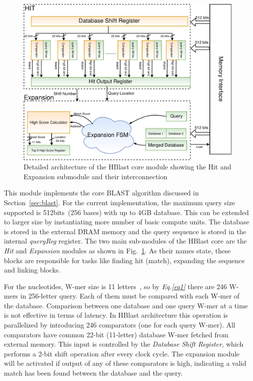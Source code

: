 \begin{figure}[t!]
\centering
\includegraphics[width=\columnwidth]{Figures/BlastMachine.pdf}
\caption{Detailed architecture of the HBlast core module showing the Hit and Expansion submodule and their interconnection} \label{fig:blastArch}
\end{figure}

This module implements the core BLAST algorithm discussed in Section~\ref{sec:blast}.
For the current implementation, the maximum query size supported is 512bits~(256 bases) with up to 4GB database. 
This can be extended to larger size by instantiating more number of basic compute units.
The database is stored in the external DRAM memory and the query sequence is stored in the internal \textit{queryReg} register.
The two main sub-modules of the HBlast core are the \textit{Hit} and \textit{Expansion} modules as shown in Fig.~\ref{fig:blastArch}. As their names state, these blocks are responsible for tasks like finding hit (match), expanding the sequence and linking blocks. 

For the nucleotides, W-mer size is 11 letters~\cite{kasap2008design}, so by \textit{Eq.\ref{eq1}} there are 246 W-mers in 256-letter query. 
Each of them must be compared with each W-mer of the database.  
Comparison between one database and one query W-mer at a time is not effective in terms of latency. 
In HBlast architecture this operation is parallelized by introducing 246 comparators (one for each query W-mer). 
All comparators have common 22-bit (11-letter) database W-mer fetched from external memory. 
This input is controlled by the \textit{Database Shift Register}, which performs a 2-bit shift operation after every clock cycle. 
The expansion module will be activated if output of any of these comparators is high, indicating a valid match has been found between the database and the query. 

